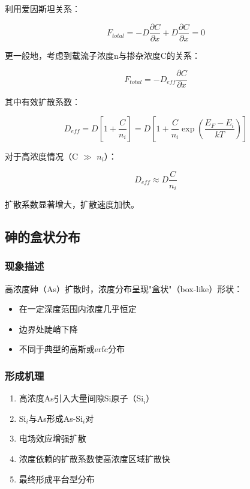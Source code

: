 \documentclass[UTF8,12pt,a4paper]{ctexart}
\begin{document}
利用爱因斯坦关系：

\begin{equation}
F_{total} = -D\frac{\partial C}{\partial x} + D\frac{\partial C}{\partial x} = 0
\end{equation}

更一般地，考虑到载流子浓度n与掺杂浓度C的关系：

\begin{equation}
F_{total} = -D_{eff}\frac{\partial C}{\partial x}
\end{equation}

其中有效扩散系数：

\begin{equation}
D_{eff} = D \left[1 + \frac{C}{n_i}\right] = D \left[1 + \frac{C}{n_i} \exp\left(\frac{E_F - E_i}{kT}\right)\right]
\end{equation}

对于高浓度情况（C $\gg$ $n_i$）：

\begin{equation}
D_{eff} \approx D \frac{C}{n_i}
\end{equation}

扩散系数显著增大，扩散速度加快。

\subsection{砷的盒状分布}

\subsubsection{现象描述}

高浓度砷（As）扩散时，浓度分布呈现"盒状"（box-like）形状：
\begin{itemize}
    \item 在一定深度范围内浓度几乎恒定
    \item 边界处陡峭下降
    \item 不同于典型的高斯或erfc分布
\end{itemize}

\subsubsection{形成机理}

\begin{enumerate}
    \item 高浓度As引入大量间隙Si原子（Si$_i$）
    \item Si$_i$与As形成As-Si$_i$对
    \item 电场效应增强扩散
    \item 浓度依赖的扩散系数使高浓度区域扩散快
    \item 最终形成平台型分布
\end{enumerate}
\end{document}
